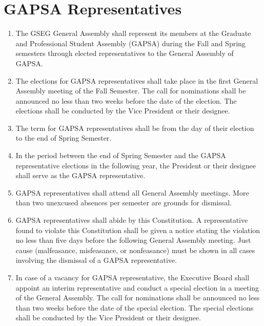 \chapter{GAPSA Representatives}
\label{art:gapsa-reps}

\begin{enumerate}[label=\Alph*.]
\item The GSEG General Assembly shall represent its members at the Graduate and Professional Student Assembly (GAPSA) during the Fall and Spring semesters through elected representatives to the General Assembly of GAPSA. 
\item The elections for GAPSA representatives shall take place in the first General Assembly
meeting of the Fall Semester. The call for nominations shall be announced no less than two weeks 
before the date of the election. The elections shall be conducted by the Vice President or their
designee. 
\item The term for GAPSA representatives shall be from the day of their election to the end of 
Spring Semester. 
\item In the period between the end of Spring Semester and the GAPSA representative elections in the following year, the President or their designee shall serve as the GAPSA representative. 

\item GAPSA representatives shall attend all General Assembly meetings. More than two unexcused
absences per semester are grounds for dismissal. 

\item GAPSA representatives shall abide by this Constitution. A representative found to violate this Constitution shall be given a notice stating the violation no less than five days before the following General Assembly meeting. Just cause (malfeasance, misfeasance, or nonfeasance) must be shown in all cases involving the dismissal of a GAPSA representative.

\item In case of a vacancy for GAPSA representative, the Executive Board shall appoint an interim
representative and conduct a special election in a meeting of the General Assembly. The call for
nominations shall be announced no less than two weeks before the date of the special election.
The special elections shall be conducted by the Vice President or their designee. 
\end{enumerate}